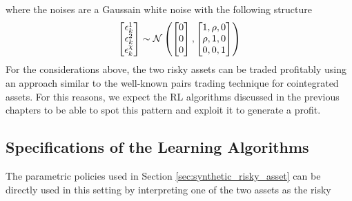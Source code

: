 where the noises are a Gaussain white noise with the following structure
\begin{equation}
	\begin{bmatrix}
	  	\epsilon_k^1\\
	  	\epsilon_k^2\\
	  	\epsilon_k^\chi\\	  
	\end{bmatrix} \sim \mathcal{N}\left( 
	\begin{bmatrix}
		  	0\\
		  	0\\
		  	0\\	  
	\end{bmatrix}, 
	\begin{bmatrix}
		  	1, \rho, 0\\
		  	\rho, 1, 0\\
		  	0, 0, 1\\	  
	\end{bmatrix}	
	\right)
\end{equation}
For the considerations above, the two risky assets can be traded profitably using an approach similar to the well-known pairs trading technique for cointegrated assets. For this reasons, we expect the RL algorithms discussed in the previous chapters to be able to spot this pattern and exploit it to generate a profit. 

\subsection{Specifications of the Learning Algorithms}
The parametric policies used in Section \ref{sec:synthetic_risky_asset} can be directly used in this setting by interpreting one of the two assets as the risky 

